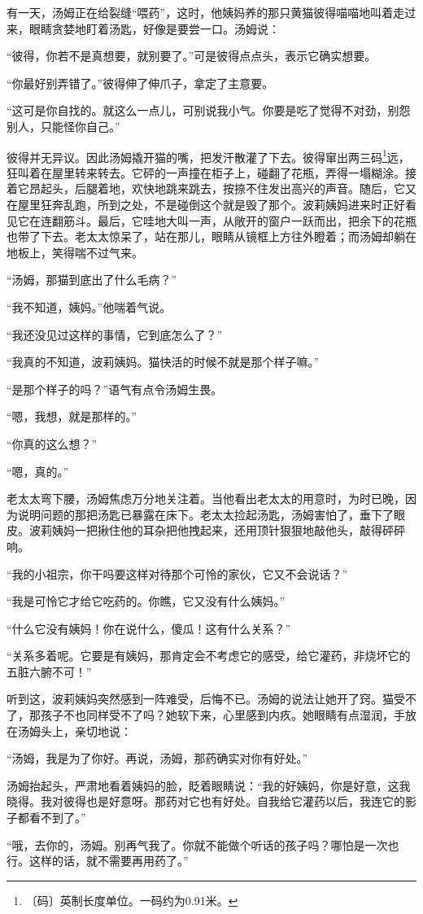 \documentclass[12pt,UTF-8,openany]{ctexbook}
\begin{document}
\begin{Large}
    有一天，汤姆正在给裂缝“喂药”，这时，他姨妈养的那只黄猫彼得喵喵地叫着走过来，眼睛贪婪地盯着汤匙，好像是要尝一口。汤姆说：
    
    “彼得，你若不是真想要，就别要了。”可是彼得点点头，表示它确实想要。
    
    “你最好别弄错了。”彼得伸了伸爪子，拿定了主意要。
    
    “这可是你自找的。就这么一点儿，可别说我小气。你要是吃了觉得不对劲，别怨别人，只能怪你自己。”
    
    彼得并无异议。因此汤姆撬开猫的嘴，把发汗散灌了下去。彼得窜出两三码\footnote{〔码〕英制长度单位。一码约为0.91米。}远，狂叫着在屋里转来转去。它砰的一声撞在柜子上，碰翻了花瓶，弄得一塌糊涂。接着它昂起头，后腿着地，欢快地跳来跳去，按捺不住发出高兴的声音。随后，它又在屋里狂奔乱跑，所到之处，不是碰倒这个就是毁了那个。波莉姨妈进来时正好看见它在连翻筋斗。最后，它哇地大叫一声，从敞开的窗户一跃而出，把余下的花瓶也带了下去。老太太惊呆了，站在那儿，眼睛从镜框上方往外瞪着；而汤姆却躺在地板上，笑得喘不过气来。
    
    “汤姆，那猫到底出了什么毛病？”
    
    “我不知道，姨妈。”他喘着气说。
    
    “我还没见过这样的事情，它到底怎么了？”
    
    “我真的不知道，波莉姨妈。猫快活的时候不就是那个样子嘛。”
    
    “是那个样子的吗？”语气有点令汤姆生畏。
    
    “嗯，我想，就是那样的。”
    
    “你真的这么想？”
    
    “嗯，真的。”
    
    老太太弯下腰，汤姆焦虑万分地关注着。当他看出老太太的用意时，为时已晚，因为说明问题的那把汤匙已暴露在床下。老太太捡起汤匙，汤姆害怕了，垂下了眼皮。波莉姨妈一把揪住他的耳杂把他拽起来，还用顶针狠狠地敲他头，敲得砰砰响。
    
    “我的小祖宗，你干吗要这样对待那个可怜的家伙，它又不会说话？”
    
    “我是可怜它才给它吃药的。你瞧，它又没有什么姨妈。”
    
    “什么它没有姨妈！你在说什么，傻瓜！这有什么关系？”
    
    “关系多着呢。它要是有姨妈，那肯定会不考虑它的感受，给它灌药，非烧坏它的五脏六腑不可！”
    
    听到这，波莉姨妈突然感到一阵难受，后悔不已。汤姆的说法让她开了窍。猫受不了，那孩子不也同样受不了吗？她软下来，心里感到内疚。她眼睛有点湿润，手放在汤姆头上，亲切地说：
    
    “汤姆，我是为了你好。再说，汤姆，那药确实对你有好处。”
    
    汤姆抬起头，严肃地看着姨妈的脸，眨着眼睛说：“我的好姨妈，你是好意，这我晓得。我对彼得也是好意呀。那药对它也有好处。自我给它灌药以后，我连它的影子都看不到了。”
    
    “哦，去你的，汤姆。别再气我了。你就不能做个听话的孩子吗？哪怕是一次也行。这样的话，就不需要再用药了。”
    
\end{Large}
\end{document}
